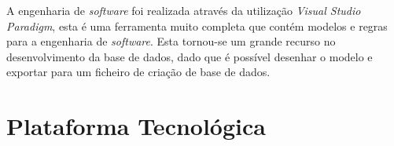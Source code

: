 A engenharia de \textit{software} foi realizada através da utilização \textit{Visual Studio Paradigm}, esta é uma ferramenta muito completa que contém modelos e regras para a engenharia de \textit{software}. Esta tornou-se um grande recurso no desenvolvimento da base de dados, dado que é possível desenhar o modelo e exportar para um ficheiro de criação de base de dados.



\newpage

\section{Plataforma Tecnológica}










\newpage





